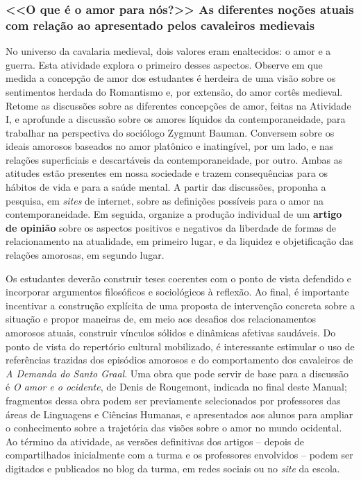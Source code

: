 \documentclass[11pt]{extarticle}
\begin{document}
\subsubsection{<<O que é o amor para nós?>> As diferentes noções atuais com relação 
ao apresentado pelos cavaleiros medievais}

  No universo da cavalaria medieval, dois valores eram enaltecidos: o
  amor e a guerra. Esta atividade explora o primeiro desses aspectos.
  Observe em que medida a concepção de amor dos estudantes é herdeira de
  uma visão sobre os sentimentos herdada do Romantismo e, por extensão,
  do amor cortês medieval. Retome as discussões sobre as diferentes
  concepções de amor, feitas na Atividade I, e aprofunde a discussão
  sobre os amores líquidos da contemporaneidade, para trabalhar na
  perspectiva do sociólogo Zygmunt Bauman. Conversem sobre os ideais
  amorosos baseados no amor platônico e inatingível, por um lado, e nas
  relações superficiais e descartáveis da contemporaneidade, por outro.
  Ambas as atitudes estão presentes em nossa sociedade e trazem
  consequências para os hábitos de vida e para a saúde mental. A partir
  das discussões, proponha a pesquisa, em \emph{sites} de internet,
  sobre as definições possíveis para o amor na contemporaneidade. Em
  seguida, organize a produção individual de um \textbf{artigo de
  opinião} sobre os aspectos positivos e negativos da liberdade de
  formas de relacionamento na atualidade, em primeiro lugar, e da
  liquidez e objetificação das relações amorosas, em segundo lugar. 


  Os estudantes deverão construir teses coerentes com o ponto de vista
  defendido e incorporar argumentos filosóficos e sociológicos à
  reflexão. Ao final, é importante incentivar a construção explícita de
  uma proposta de intervenção concreta sobre a situação e propor
  maneiras de, em meio aos desafios dos relacionamentos amorosos atuais,
  construir vínculos sólidos e dinâmicas afetivas saudáveis. Do ponto de
  vista do repertório cultural mobilizado, é interessante estimular o
  uso de referências trazidas dos episódios amorosos e do comportamento
  dos cavaleiros de \emph{A Demanda do Santo Graal}. Uma obra que pode
  servir de base para a discussão é \emph{O amor e o ocidente}, de Denis
  de Rougemont, indicada no final deste Manual; fragmentos dessa obra
  podem ser previamente selecionados por professores das áreas de
  Linguagens e Ciências Humanas, e apresentados aos alunos para ampliar
  o conhecimento sobre a trajetória das visões sobre o amor no mundo
  ocidental. Ao término da atividade, as versões definitivas dos artigos
  -- depois de compartilhados inicialmente com a turma e os professores
  envolvidos -- podem ser digitados e publicados no blog da turma, em
  redes sociais ou no \emph{site} da escola. 
\end{document}
